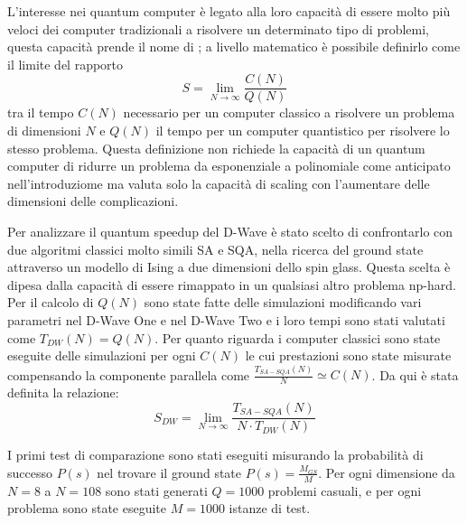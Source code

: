 
L'interesse nei quantum computer è legato alla loro capacità di essere molto più veloci dei computer tradizionali a risolvere un determinato tipo di problemi, questa capacità prende il nome di ; a livello matematico è possibile definirlo\cite{DDQS} come il limite del rapporto
$$S = \lim_{N \to \infty} \frac{C(N)}{Q(N)}$$
tra il tempo $C(N)$ necessario per un computer classico a risolvere un problema di dimensioni $N$ e $Q(N)$ il tempo per un computer quantistico per risolvere lo stesso problema. Questa definizione non richiede la capacità di un quantum computer di ridurre un problema da esponenziale a polinomiale come anticipato nell'introduziome ma valuta solo la capacità di scaling con l'aumentare delle dimensioni delle complicazioni.


Per analizzare il quantum speedup del D-Wave è stato scelto di confrontarlo con due algoritmi classici molto simili SA e SQA, nella ricerca del ground state attraverso un modello di Ising a due dimensioni dello spin glass.
Questa scelta è dipesa dalla capacità di essere rimappato in un qualsiasi altro problema np-hard. Per il calcolo di $Q(N)$ sono state fatte delle simulazioni modificando vari parametri nel D-Wave One e nel D-Wave Two e i loro tempi sono stati valutati come $T_{DW}(N) = Q(N)$. Per quanto riguarda i computer classici sono state eseguite delle simulazioni per ogni $C(N)$ le cui prestazioni sono state misurate compensando la componente parallela\cite{EQA} come
 $\frac{T_{SA-SQA}(N)}{N} \simeq C(N)$. Da qui è stata definita\cite{DDQS} la relazione:
$$S_{DW} = \lim_{N \to \infty} \frac{T_{SA-SQA}(N)}{N \cdot T_{DW}(N)}$$

I primi test di comparazione sono stati eseguiti misurando la probabilità di successo $P(s)$ nel trovare il ground state $P(s) = \frac{M_{GS}}{M}$. Per ogni dimensione da $N=8$ a $N=108$ sono stati generati $Q=1000$ problemi casuali, e per ogni problema sono state eseguite $M=1000$ istanze di test.

